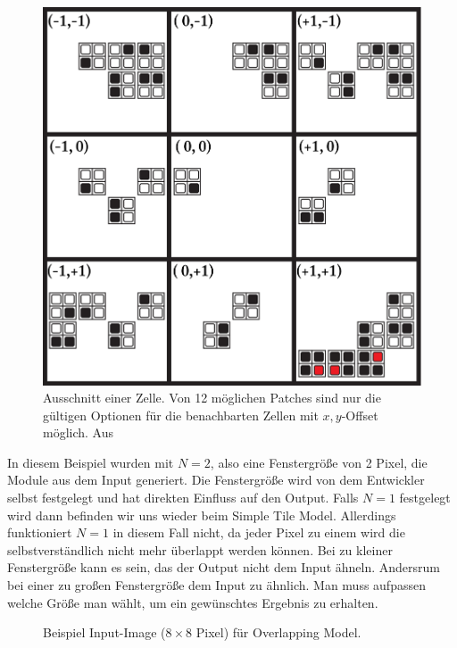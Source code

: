 \documentclass[12pt, a4paper,twoside,openright]{report} %
\begin{document}
\begin{figure}[H]
    \centering
    \includegraphics[width=0.5\linewidth]{images/red-maze-offset-example.png}%
    \caption{Ausschnitt einer Zelle. Von 12 möglichen Patches sind nur die gültigen Optionen für die benachbarten Zellen mit $x,y$-Offset möglich. Aus \cite{Karth2017WaveFunctionCollapseIC}}%
\end{figure}

In diesem Beispiel wurden mit $N = 2$, also eine Fenstergröße von 2 Pixel, die Module aus dem Input generiert.
Die Fenstergröße wird von dem Entwickler selbst festgelegt und hat direkten Einfluss auf den Output.
Falls $N = 1$ festgelegt wird dann befinden wir uns wieder beim Simple Tile Model.
Allerdings funktioniert $N = 1$ in diesem Fall nicht, da jeder Pixel zu einem  wird die selbstverständlich nicht mehr überlappt werden können.
Bei zu kleiner Fenstergröße kann es sein, das der Output nicht dem Input ähneln.
Andersrum bei einer zu großen Fenstergröße dem Input zu ähnlich.
Man muss aufpassen welche Größe man wählt, um ein gewünschtes Ergebnis zu erhalten.

\begin{figure}[H]
    \centering
    \caption{Beispiel Input-Image ($8\times8$ Pixel) für Overlapping Model.}%
\end{figure}
\end{document}
